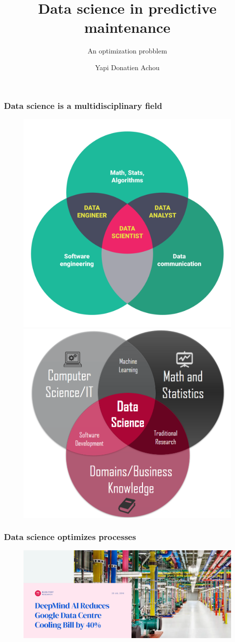 \documentclass{beamer}
\title[\textcolor{orange}{Karsten Moholt Digital}] %
 {Data science in predictive maintenance }
\subtitle{An optimization probblem}
\author[] %
 {Yapi Donatien Achou}
\begin{document}
 
\frame{\titlepage}
 
 
 
 
 
 
\begin{frame}
\frametitle{Data science is a multidisciplinary field}
\begin{figure}[H]
	\centering
	\includegraphics[width=0.4\linewidth]{datascience2}
	\includegraphics[width=0.4\linewidth]{datascience}
\end{figure}
\end{frame}
\begin{frame}
	\frametitle{Data science optimizes processes}
	\begin{figure}[H]
		\centering
		\includegraphics[width=1\linewidth]{google-data-center}
	\end{figure}
\end{frame}
\end{document}
